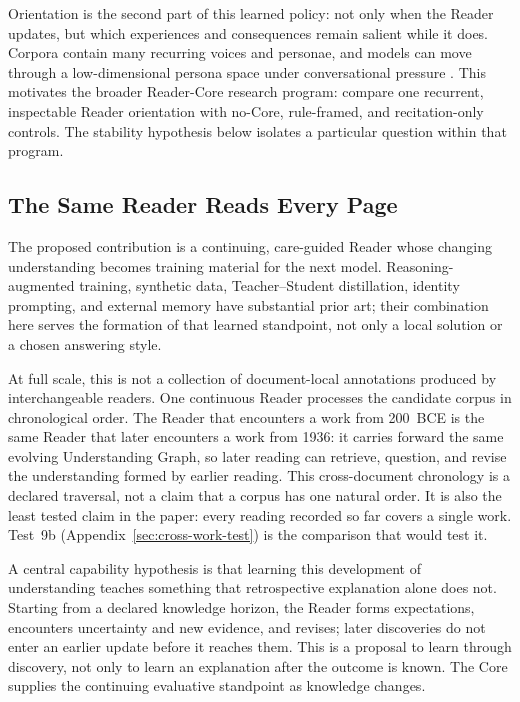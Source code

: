 \documentclass[11pt]{article}
\begin{document}
Orientation is the second part of this learned policy: not only when the Reader
updates, but which experiences and consequences remain salient while it does.
Corpora contain many recurring voices and personae, and models can move through a
low-dimensional persona space under conversational pressure
\cite{lu2026assistantaxissituatingstabilizing}. This motivates the broader Reader-Core research program: compare one recurrent,
inspectable Reader orientation with no-Core, rule-framed, and recitation-only
controls. The stability hypothesis below isolates a particular question within that program.


\subsection{The Same Reader Reads Every Page}\label{sec:same-reader}

The proposed contribution is a continuing, care-guided Reader whose changing
understanding becomes training material for the next model. Reasoning-augmented
training, synthetic data, Teacher--Student distillation, identity prompting,
and external memory have substantial prior art; their combination here serves
the formation of that learned standpoint, not only a local solution or a
chosen answering style.

At full scale, this is not a
collection of document-local annotations produced by interchangeable readers.
One continuous Reader processes the candidate corpus in chronological order.
The Reader that encounters a work from 200~BCE is the same Reader that later
encounters a work from 1936: it carries forward the same evolving Understanding
Graph, so later reading can retrieve, question, and revise the understanding
formed by earlier reading. This cross-document chronology is a declared
traversal, not a claim that a corpus has one natural order. It is also the
least tested claim in the paper: every reading recorded so far covers a single
work. Test~9b (Appendix~\ref{sec:cross-work-test}) is the comparison that would
test it.

A central capability hypothesis is that learning this development of
understanding teaches something that retrospective explanation alone does not.
Starting from a declared knowledge horizon, the Reader forms expectations,
encounters uncertainty and new evidence, and revises; later discoveries do not
enter an earlier update before it reaches them. This is a proposal to learn
through discovery, not only to learn an explanation after the outcome is known.
The Core supplies the continuing evaluative standpoint as knowledge changes.
\end{document}
